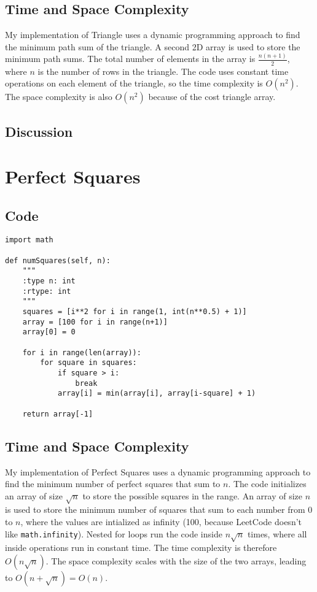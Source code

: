 \documentclass[12pt]{article}
\begin{document}
\subsection{Time and Space Complexity}
My implementation of Triangle uses a dynamic programming approach to find the minimum
path sum of the triangle. A second 2D array is used to store the minimum path sums.
The total number of elements in the array is \( \frac{n(n+1)}{2} \), where \( n \) is the 
number of rows in the triangle. The code uses constant time operations on each element of the triangle,
so the time complexity is \( O(n^2) \). The space complexity is also \( O(n^2) \) because of the
cost triangle array.

\subsection{Discussion}

\newpage
\section{Perfect Squares}
\subsection{Code}
\lstset{
    caption=Perfect Squares,
}
\begin{lstlisting}
import math

def numSquares(self, n):
    """
    :type n: int
    :rtype: int
    """
    squares = [i**2 for i in range(1, int(n**0.5) + 1)]
    array = [100 for i in range(n+1)]
    array[0] = 0

    for i in range(len(array)):
        for square in squares:
            if square > i:
                break
            array[i] = min(array[i], array[i-square] + 1)

    return array[-1]
\end{lstlisting}

\subsection{Time and Space Complexity}
My implementation of Perfect Squares uses a dynamic programming approach to find the
minimum number of perfect squares that sum to \( n \). The code initializes an array of size \( \sqrt n \)
to store the possible squares in the range. An array of size \( n \) is used to store the minimum number of
squares that sum to each number from 0 to \( n \), where the values are intialized as infinity (100, because
LeetCode doesn't like \texttt{math.infinity}). Nested for loops run the code inside \( n \sqrt n \) times,
where all inside operations run in constant time. The time complexity is therefore \( O(n \sqrt n) \).
The space complexity scales with the size of the two arrays, leading to \( O(n + \sqrt n) = O(n) \).
\end{document}
